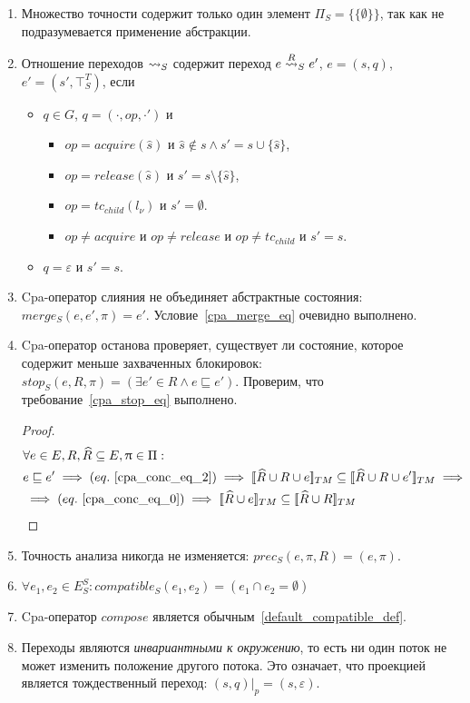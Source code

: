 \begin{enumerate}
\item Множество точности содержит только один элемент $\Pi_S = \{\{\emptyset\}\}$, так как не подразумевается применение абстракции.

\item Отношение переходов $\leadsto_S$ содержит переход $e \stackrel{R}{\leadsto}_S e'$, $e = (s,q)$, $e' = (s', \top^T_S)$, если


\begin{itemize}
 \item $q \in G$, $q=(\cdot,op,\cdot')$ и 
\begin{itemize}
\item $op=acquire(\hat s)$ и $\hat s \notin s \land s' = s \cup \{\hat s\}$,
\item $op=release(\hat s)$ и $s' = s \setminus \{\hat s\}$,
\item $op=tc_{child}(l_\nu)$ и $s' = \emptyset$. 
\item $op \neq acquire$ и $op \neq release$ и $op \neq tc_{child}$ и $s' = s$.
\end{itemize}
 \item $q = \varepsilon$ и $s' = s$.
\end{itemize}

\item Cpa-оператор слияния не объединяет абстрактные состояния: $merge_S(e, e', \pi) = e'$. Условие~\ref{cpa_merge_eq} очевидно выполнено.

\item Cpa-оператор останова проверяет, существует ли состояние, которое содержит меньше захваченных блокировок: $stop_S(e, R, \pi) = (\exists e' \in R \land e \sqsubseteq e')$.
Проверим, что требование~\ref{cpa_stop_eq} выполнено.
\begin{proof}
\begin{align*}
&\forall e \in E, R, \widehat{R} \subseteq E, \pi \in \Pi: \\
& e \sqsubseteq e' \implies (eq.~\ref{cpa_conc_eq_2}) \implies \conctm{\widehat{R} \cup R \cup e} \subseteq \conctm{\widehat{R} \cup R \cup e'} \implies \\
& \implies (eq.~\ref{cpa_conc_eq_0}) \implies \conctm{\widehat{R} \cup e} \subseteq \conctm{\widehat{R} \cup R} 
\end{align*}
\end{proof}

\item Точность анализа никогда не изменяется: $prec_S(e, \pi, R) = (e, \pi)$.

\item $\forall e_1, e_2 \in E^S_S: compatible_S(e_1,e_2) = (e_1 \cap e_2 = \emptyset)$

\item Cpa-оператор $compose$ является обычным~\ref{default_compatible_def}.

\item Переходы являются {\em инвариантными к окружению}, то есть ни один поток не может изменить положение другого потока.
Это означает, что проекцией является тождественный переход:
$(s, q)|_p = (s, \varepsilon)$.
\end{enumerate}

